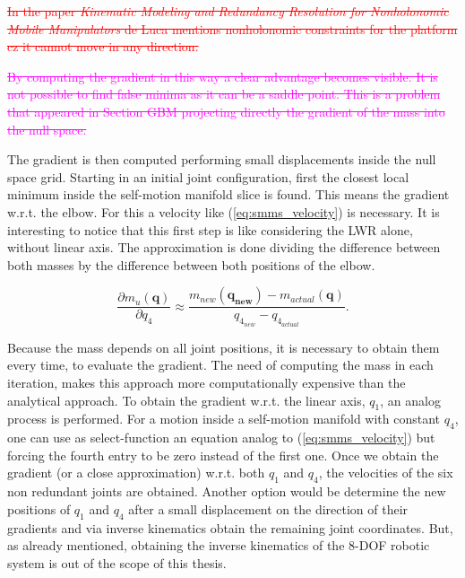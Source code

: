\textcolor{red}{\st{In the paper \textit{Kinematic Modeling and Redundancy Resolution for Nonholonomic Mobile Manipulators} de Luca  mentions nonholonomic constraints for the platform cz it cannot move in any direction.} } 






\textcolor{magenta}{ \st{By computing the gradient in this way a clear advantage becomes visible. It is not possible to find false minima as it can be a saddle point. This is a problem that appeared in Section GBM  projecting directly the gradient of the mass into the null space.} } 


The gradient is then computed performing small displacements inside the null space grid. Starting in an initial joint configuration, first the closest local minimum inside the self-motion manifold slice is found. This means the gradient w.r.t. the elbow. For this a velocity like (\ref{eq:smms_velocity}) is necessary. It is interesting to notice that this first step is like considering the LWR alone, without linear axis. The approximation is done dividing the difference between both  masses by the difference between both positions of the elbow. 



\begin{equation}
\frac{\partial {m_u(\mathbf{q})}}{\partial {q_4}} \approx \frac{m_{new}(\mathbf{q_{new}}) - m_{actual}(\mathbf{q})}{ q_{4_{new}} - q_{4_{actual}}}.
\label{eq:approx_grad_q4}
\end{equation}



Because the mass depends on all joint positions, it is necessary to obtain them every time, to evaluate the gradient. The need of computing the mass in each iteration, makes this approach more computationally expensive than the analytical approach. To obtain the gradient w.r.t. the linear axis, $q_1$, an analog process is performed. For a motion inside a self-motion manifold with constant $q_4$, one can use as select-function an equation analog to (\ref{eq:smms_velocity}) but forcing the fourth entry to be zero instead of the first one. 
Once we obtain the gradient (or a close approximation) w.r.t. both $q_1$ and $q_4$, the velocities of the six non redundant joints are obtained. 
Another option would be determine the new positions of $q_1$ and $q_4$ after a small displacement on the direction of their gradients and via inverse kinematics obtain the remaining joint coordinates. But, as already mentioned, obtaining the inverse kinematics of the 8-DOF robotic system is out of the scope of this thesis.



